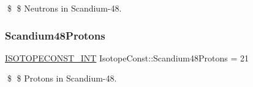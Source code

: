 \$ \$ Neutrons in Scandium-\/48. \mbox{\label{group___isotope_const-_scandium-_sc48_ga30505588717a9759e5b57f88038a2f1e}} 
\subsubsection{\texorpdfstring{Scandium48\+Protons}{Scandium48Protons}}
{\footnotesize\ttfamily \mbox{\hyperlink{group___isotope_const-_macros_ga5f18360b3e99483a35c32d789e62621c}{I\+S\+O\+T\+O\+P\+E\+C\+O\+N\+S\+T\+\_\+\+I\+NT}} Isotope\+Const\+::\+Scandium48\+Protons = 21}

\$ \$ Protons in Scandium-\/48. 